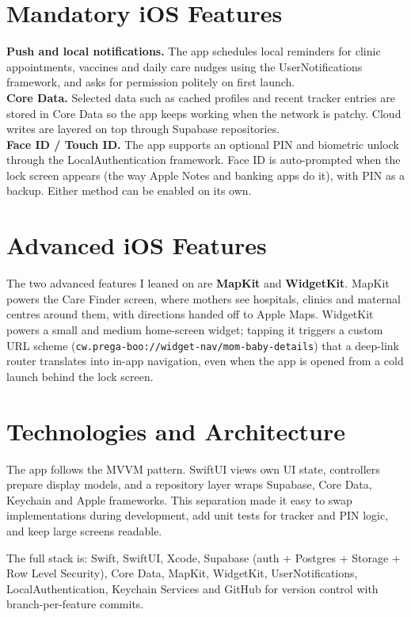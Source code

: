 \documentclass[12pt,a4paper]{article}
\begin{document}
\section{Mandatory iOS Features}
\textbf{Push and local notifications.} The app schedules local reminders for clinic appointments, vaccines and daily care nudges using the UserNotifications framework, and asks for permission politely on first launch.\\
\textbf{Core Data.} Selected data such as cached profiles and recent tracker entries are stored in Core Data so the app keeps working when the network is patchy. Cloud writes are layered on top through Supabase repositories.\\
\textbf{Face ID / Touch ID.} The app supports an optional PIN and biometric unlock through the LocalAuthentication framework. Face ID is auto-prompted when the lock screen appears (the way Apple Notes and banking apps do it), with PIN as a backup. Either method can be enabled on its own.

\section{Advanced iOS Features}
The two advanced features I leaned on are \textbf{MapKit} and \textbf{WidgetKit}. MapKit powers the Care Finder screen, where mothers see hospitals, clinics and maternal centres around them, with directions handed off to Apple Maps. WidgetKit powers a small and medium home-screen widget; tapping it triggers a custom URL scheme (\texttt{cw.prega-boo://widget-nav/mom-baby-details}) that a deep-link router translates into in-app navigation, even when the app is opened from a cold launch behind the lock screen.

\section{Technologies and Architecture}
The app follows the MVVM pattern. SwiftUI views own UI state, controllers prepare display models, and a repository layer wraps Supabase, Core Data, Keychain and Apple frameworks. This separation made it easy to swap implementations during development, add unit tests for tracker and PIN logic, and keep large screens readable.

The full stack is: Swift, SwiftUI, Xcode, Supabase (auth + Postgres + Storage + Row Level Security), Core Data, MapKit, WidgetKit, UserNotifications, LocalAuthentication, Keychain Services and GitHub for version control with branch-per-feature commits.
\end{document}
